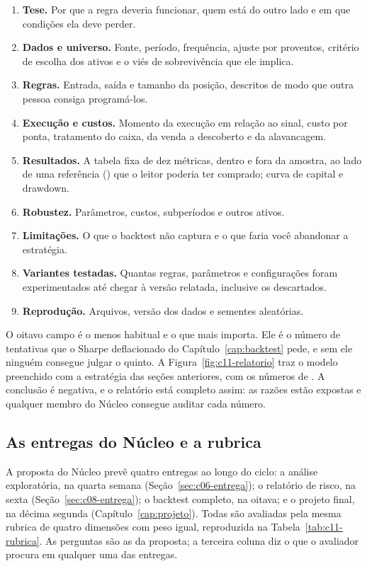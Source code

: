 \begin{enumerate}
  \item \textbf{Tese.} Por que a regra deveria funcionar, quem está do outro lado e em que condições ela deve perder.
  \item \textbf{Dados e universo.} Fonte, período, frequência, ajuste por proventos, critério de escolha dos ativos e o viés de sobrevivência que ele implica.
  \item \textbf{Regras.} Entrada, saída e tamanho da posição, descritos de modo que outra pessoa consiga programá-los.
  \item \textbf{Execução e custos.} Momento da execução em relação ao sinal, custo por ponta, tratamento do caixa, da venda a descoberto e da alavancagem.
  \item \textbf{Resultados.} A tabela fixa de dez métricas, dentro e fora da amostra, ao lado de uma referência () que o leitor poderia ter comprado; curva de capital e drawdown.
  \item \textbf{Robustez.} Parâmetros, custos, subperíodos e outros ativos.
  \item \textbf{Limitações.} O que o backtest não captura e o que faria você abandonar a estratégia.
  \item \textbf{Variantes testadas.} Quantas regras, parâmetros e configurações foram experimentados até chegar à versão relatada, inclusive os descartados.
  \item \textbf{Reprodução.} Arquivos, versão dos dados e sementes aleatórias.
\end{enumerate}

O oitavo campo é o menos habitual e o que mais importa. Ele é o número de tentativas que o Sharpe deflacionado do Capítulo~\ref{cap:backtest} pede, e sem ele ninguém consegue julgar o quinto. A Figura~\ref{fig:c11-relatorio} traz o modelo preenchido com a estratégia das seções anteriores, com os números de . A conclusão é negativa, e o relatório está completo assim: as razões estão expostas e qualquer membro do Núcleo consegue auditar cada número.

\subsection{As entregas do Núcleo e a rubrica}
\label{sec:c11-rubrica}

A proposta do Núcleo prevê quatro entregas ao longo do ciclo: a análise exploratória, na quarta semana (Seção~\ref{sec:c06-entrega}); o relatório de risco, na sexta (Seção~\ref{sec:c08-entrega}); o backtest completo, na oitava; e o projeto final, na décima segunda (Capítulo~\ref{cap:projeto}). Todas são avaliadas pela mesma rubrica de quatro dimensões com peso igual, reproduzida na Tabela~\ref{tab:c11-rubrica}. As perguntas são as da proposta; a terceira coluna diz o que o avaliador procura em qualquer uma das entregas.

